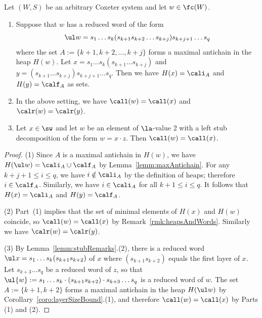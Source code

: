 \begin{lemma}
    \label{lemm:decompAndDescent}
    Let $(W,S)$ be an arbitrary Coxeter system and let $w\in \fc(W)$.
    \begin{enumerate}
        \item Suppose that $w$ has a reduced word of the form 
            \[
                \ul w=s_1\dots s_k (s_{k+1}s_{k+2}\dots s_{k+j})s_{k+j+1}\dots s_{q}
         \]
         where the set $A:=\{k+1,k+2,\dots,k+j\}$ forms a maximal antichain in
             the heap $H(w)$. Let $x=s_1\dots s_k(s_{k+1}\dots s_{k+j})$ and $y=(s_{k+1}\dots s_{k+j})s_{k+j+1}\dots s_q$.
             Then we have $H(x)=\cali_A$ and $H(y)=\calf_A$ as sets. 
            
        \item In the above setting, we have $\call(w)=\call(x)$ and $\calr(w)=\calr(y)$.  

        \item Let $x\in \sw$ and let $w$ be an element of $\la$-value 2 with a
    left stub decomposition of the form $w=x\cdot z$. Then $\call(w)=\call(x)$.
    \end{enumerate}
\end{lemma}
\begin{proof}
    (1) Since $A$ is a maximal antichain in $H(w)$, we have $H(\ul w)=\cali_{A}\cup\calf_{A}$ by
    Lemma~\ref{lemm:maxAntichain}. For any $k+j+1\le i\le q$, we have $i\notin\cali_A$ by the definition
    of heaps; therefore $i\in \calf_A$. Similarly, we have $i\in \cali_A$ for all $k+1\le i\le q$.
    It follows that $H(x)=\cali_A$ and $H(y)=\calf_A$.

    (2) Part~(1) implies that the set of minimal elements of $H(x)$ and $H(w)$ coincide, so
    $\call(w)= \call(x)$ by Remark~\ref{rmk:heapsAndWords}. Similarly we have $\calr(w)=\calr(y)$.

    (3) By Lemma~\ref{lemm:stubRemarks}.(2), there is a reduced word $\ul x=s_1\dots
    s_{k}(s_{k+1}s_{k+2})$ of $x$ where $(s_{k+1}s_{k+2})$ equals the first layer of $x$. Let
    $s_{k+3}\dots s_{q}$ be a reduced word of $z$, so that $\ul{w}:=s_1\dots s_k\cdot
    (s_{k+1}s_{k+2})\cdot s_{k+3}\dots s_{q}$ is a reduced word of $w$.  The set $A:=\{k+1,k+2\}$
    forms a maximal antichain in the heap $H(\ul w)$ by Corollary~\ref{coro:layerSizeBound}.(1), and
    therefore $\call(w)=\call(x)$ by Parts (1) and (2).
\end{proof}

